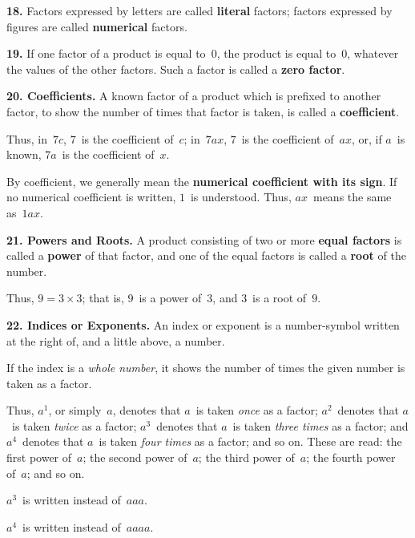 \documentclass[12pt]{book}[2005/09/16]
\newcommand{\Paragraph}[1]{\medskip\par\textbf{#1}}
\newcommand{\Defn}[1]{\textbf{#1}}
\newenvironment{Remark}[1][]{\par\small\textsc{#1}}{\par}
\begin{document}
\Paragraph{18.}  Factors expressed by letters are called \Defn{literal} factors;
factors expressed by figures are called \Defn{numerical} factors.

\Paragraph{19.}  If one factor of a product is equal to~$0$, the product
is equal to~$0$, whatever the values of the other factors.
Such a factor is called a \Defn{zero factor}.

\Paragraph{20.  Coefficients.}  A known factor of a product which is
prefixed to another factor, to show the number of times that
factor is taken, is called a \Defn{coefficient}.

\begin{Remark}
Thus, in~$7c$, $7$~is the coefficient of~$c$; in~$7ax$, $7$~is the
coefficient of~$ax$,
or, if $a$~is known, $7a$~is the coefficient of~$x$.
\end{Remark}

By coefficient, we generally mean the \textbf{numerical coefficient
with its sign}.  If no numerical coefficient is written, $1$~is
understood.  Thus, $ax$~means the same as~$1ax$.

\Paragraph{21.  Powers and Roots.}  A product consisting of two or
more \textbf{equal factors} is called a \Defn{power} of that factor, and one
of the equal factors is called a \Defn{root} of the number.

\begin{Remark}
Thus, $9 = 3 × 3$; that is, $9$~is a power of~$3$, and $3$~is a root of~$9$.
\end{Remark}

\Paragraph{22.  Indices or Exponents.}  An index or  exponent is a
number-symbol written at the right of, and a little above,
a number.

If the index is a \emph{whole number}, it shows the number
of times the given number is taken as a factor.

\begin{Remark}
Thus, $a^{1}$, or simply~$a$, denotes that $a$~is taken \emph{once} as a
factor; $a^{2}$~denotes
that $a$~is taken \emph{twice} as a factor; $a^{3}$~denotes that $a$~is taken
\emph{three times} as a factor; and $a^{4}$~denotes that $a$~is taken \emph{four times} as a
factor; and so on.  These are read: the first power of~$a$; the second
power of~$a$; the third power of~$a$; the fourth power of~$a$; and so on.

$a^{3}$~is written instead of~$aaa$.

$a^{4}$~is written instead of~$aaaa$.
\end{Remark}
\end{document}
